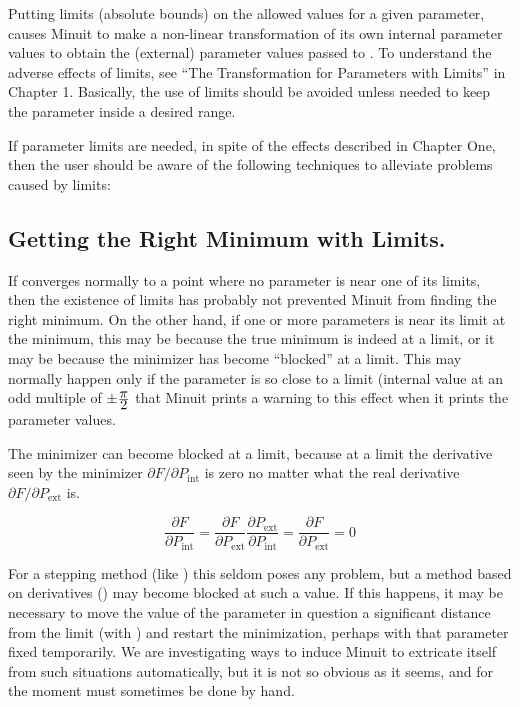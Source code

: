 Putting limits (absolute bounds) on the allowed values for
a given parameter, causes Minuit to make a non-linear
transformation of its own internal parameter values to obtain the
(external) parameter values passed to .
To understand the adverse effects of limits, see ``The Transformation
for Parameters with Limits'' in Chapter 1.
Basically, the use of limits should be avoided unless needed to
keep the parameter inside a desired range.
 
If parameter limits are needed, in spite of the effects described
in Chapter One, then the user should be aware of the following
techniques to alleviate problems caused by limits:

\subsection{Getting the Right Minimum with Limits.}

If  converges normally to a point where no parameter is
near one of its limits, then the existence of limits has
probably not prevented Minuit from finding the right minimum.
On the other hand, if one or more parameters is near its limit
at the minimum, this may be because the true minimum is indeed
at a limit, or it may be because the minimizer has become 
``blocked'' at a limit.  
This may normally happen only if the parameter
is so close to a limit (internal value at an odd multiple
of $\pm \frac{\textstyle \pi}{\textstyle 2}$ that Minuit prints a warning to this effect
when it prints the parameter values.

The minimizer can become blocked at a limit, because at a limit
the derivative seen by the minimizer 
$\partial F / \partial P_{\mathrm{int}}$
is zero no matter what the real derivative
$\partial F / \partial P_{\mathrm{ext}}$ is.

\[
\frac{\partial F}{\partial P_{\mathrm{int}}}                =
\frac{\partial F}{\partial P_{\mathrm{ext}}}
\frac{\partial P_{\mathrm{ext}}}{\partial P_{\mathrm{int}}} =
\frac{\partial F}{\partial P_{\mathrm{ext}}}                = 0
\]

For a stepping method (like ) 
this seldom poses any problem,
but a method based on derivatives () may become blocked
at such a value.
If this happens, it may be necessary to move the value of the
parameter in question a significant distance from the
limit (with ) and restart the minimization, perhaps
with that parameter fixed temporarily.
We are investigating ways to induce Minuit to extricate itself from
such situations automatically, but it is not so obvious as it seems,
and for the moment must sometimes be done by hand.

